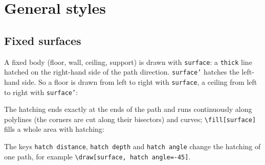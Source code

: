 \documentclass[a4paper,11pt]{article}
\newcommand\key[1]{\texttt{#1}}
\begin{document}
\section{General styles}

\subsection{Fixed surfaces}
A fixed body (floor, wall, ceiling, support) is drawn with \key{surface}: a
\key{thick} line hatched on the right-hand side of the path direction.
\key{surface'} hatches the left-hand side. So a floor is drawn from left to
right with \key{surface}, a ceiling from left to right with \key{surface'}:
\begin{example}
\end{example}
The hatching ends exactly at the ends of the path and runs continuously
along polylines (the corners are cut along their bisectors) and curves;
\verb|\fill[surface]| fills a whole area with hatching:
\begin{example}
\end{example}
The keys \key{hatch distance}, \key{hatch depth} and \key{hatch angle}
change the hatching of one path, for example
\verb|\draw[surface, hatch angle=-45]|.
\end{document}
